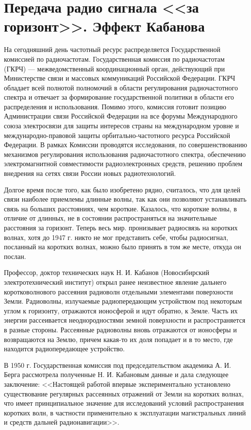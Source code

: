 \section{Передача радио сигнала <<за горизонт>>. Эффект Кабанова}
На сегодняшний день частотный ресурс распределяется Государственной комиссией по радиочастотам.
Государственная комиссия по радиочастотам (ГКРЧ) — межведомственный координационный орган, действующий при Министерстве связи и массовых коммуникаций Российской Федерации. ГКРЧ обладает всей полнотой полномочий в области регулирования радиочастотного спектра и отвечает за формирование государственной политики в области его распределения и использования. Помимо этого, комиссия готовит позицию Администрации связи Российской Федерации на все форумы Международного союза электросвязи для защиты интересов страны на международном уровне и международно-правовой защиты орбитально-частотного ресурса Российской Федерации. В рамках Комиссии проводятся исследования, по совершенствованию механизмов регулирования использования радиочастотного спектра, обеспечению электромагнитной совместимости радиоэлектронных средств, решению проблем внедрения на сетях связи России новых радиотехнологий.

Долгое время после того, как было изобретено рядио, считалось, что для целей связи наиболее приемлемы
длинные волны, так как они позволяют устанавливать связь на больших расстояниях, чем короткие.
Казалось, что короткие волны, в отличие от длинных, не в состоянии распространяться на значительные
расстояния за горизонт. Теперь весь мир. пронизывает радиосвязь на коротких волнах, хотя до 1947 г.
никто не мог представить себе, чтобы радиосигнал, посланный на коротких волнах, можно было принять
в том же месте, откуда он послан.

Профессор, доктор технических наук Н. И. Кабанов (Новосибирский электротехнический институт) открыл
ранее неизвестное явление дальнего коротковолнового рассеяния радиоволн отдельными элементами
поверхности Земли. Радиоволны, излучаемые радиопередающим устройством под некоторым углом к горизонту,
отражаются ионосферой и идут обратно, к Земле. Часть их энергии рассеивается неоднородностями земной
поверхности и распространяется в разные стороны. Рассеянные радиоволны вновь отражаются от ионосферы
и возвращаются на Землю, причем какая-то их доля попадает и в то место, где находится радиопередающее устройство.

В 1950 г. Государственная комиссия под председательством академика А. И. Берга рассмотрела полученные
Н. И. Кабановым данные и дала следующее заключение: <<Настоящей работой впервые экспериментально установлено
существование регулярных рассеянных отражений от Земли на коротких волнах, что имеет принципиальное
значение для исследований условий распространения коротких волн, в частности применительно к эксплуатации
магистральных линий и средств дальней радионавигации>>.


